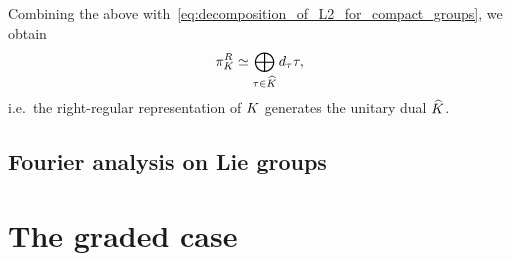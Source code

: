 Combining the above with~\eqref{eq:decomposition_of_L2_for_compact_groups},
we obtain
\begin{align*}
    \pi^R_{K} \simeq \bigoplus_{\tau \in {\widehat{K}}} {d_{\tau}} \tau,
\end{align*}
i.e.\ the right-regular representation of $K$ generates the unitary dual ${\widehat{K}}$.

\subsection{Fourier analysis on Lie groups}

\section{The graded case}
